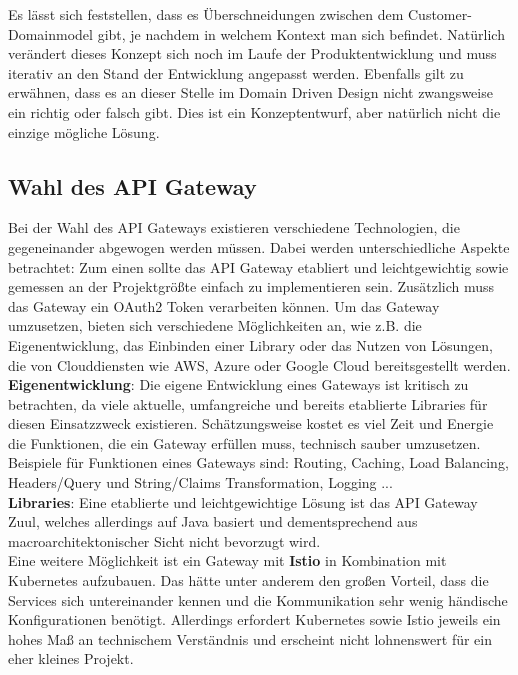 {Es lässt sich feststellen, dass es Überschneidungen zwischen dem Customer-Domainmodel gibt, je nachdem in welchem Kontext man sich befindet. Natürlich verändert dieses Konzept sich noch im Laufe der Produktentwicklung und muss iterativ an den Stand der Entwicklung angepasst werden. Ebenfalls gilt zu erwähnen, dass es an dieser Stelle im Domain Driven Design nicht zwangsweise ein richtig oder falsch gibt. Dies ist ein Konzeptentwurf, aber natürlich nicht die einzige mögliche Lösung.

\subsection{Wahl des API Gateway}

Bei der Wahl des API Gateways existieren verschiedene Technologien, die gegeneinander abgewogen werden müssen. Dabei werden unterschiedliche Aspekte betrachtet: Zum einen sollte das API Gateway etabliert und leichtgewichtig sowie gemessen an der Projektgrößte einfach zu implementieren sein. Zusätzlich muss das Gateway ein OAuth2 Token verarbeiten können. Um das Gateway umzusetzen, bieten sich verschiedene Möglichkeiten an, wie z.B. die Eigenentwicklung, das Einbinden einer Library oder das Nutzen von Lösungen, die von Clouddiensten wie AWS, Azure oder Google Cloud bereitsgestellt werden. \\

\textbf{Eigenentwicklung}: Die eigene Entwicklung eines Gateways ist kritisch zu betrachten, da viele aktuelle, umfangreiche und bereits etablierte Libraries für diesen Einsatzzweck existieren. Schätzungsweise kostet es viel Zeit und Energie die Funktionen, die ein Gateway erfüllen muss, technisch sauber umzusetzen. Beispiele für Funktionen eines Gateways sind: Routing, Caching, Load Balancing, Headers/Query und String/Claims Transformation, Logging ...  \\

\textbf{Libraries}: Eine etablierte und leichtgewichtige Lösung ist das API Gateway Zuul, welches allerdings auf Java basiert und dementsprechend aus macroarchitektonischer Sicht nicht bevorzugt wird. \\

Eine weitere Möglichkeit ist ein Gateway mit \textbf{Istio} in Kombination mit Kubernetes aufzubauen. Das hätte unter anderem den großen Vorteil, dass die Services sich untereinander kennen und die Kommunikation sehr wenig händische Konfigurationen benötigt. Allerdings erfordert Kubernetes sowie Istio jeweils ein hohes Maß an technischem Verständnis und erscheint nicht lohnenswert für ein eher kleines Projekt.\cite{HeiseIstio}\cite{istioQuickstart} \\    

}
